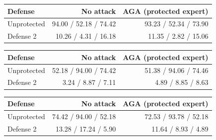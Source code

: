 \begin{tabular}{lrr}
\toprule
Defense & No attack & AGA (protected expert) \\
\midrule
Unprotected & 94.00 / 52.18 / 74.42 & 93.23 / 52.34 / 73.90 \\
Defense 2 & 10.26 / 4.31 / 16.18 & 11.35 / 2.82 / 15.06 \\
\bottomrule
\end{tabular}

\begin{tabular}{lrr}
\toprule
Defense & No attack & AGA (protected expert) \\
\midrule
Unprotected & 52.18 / 94.00 / 74.42 & 51.38 / 94.06 / 74.46 \\
Defense 2 & 3.24 / 8.87 / 7.11 & 4.89 / 8.85 / 8.63 \\
\bottomrule
\end{tabular}

\begin{tabular}{lrr}
\toprule
Defense & No attack & AGA (protected expert) \\
\midrule
Unprotected & 74.42 / 94.00 / 52.18 & 72.53 / 93.78 / 52.18 \\
Defense 2 & 13.28 / 17.24 / 5.90 & 11.64 / 8.93 / 4.89 \\
\bottomrule
\end{tabular}

